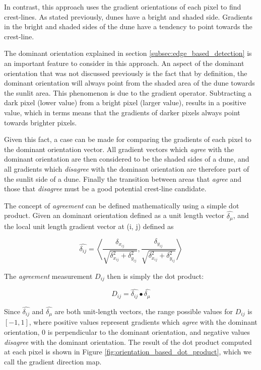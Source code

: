 In contrast, this approach uses the gradient orientations of each pixel to find crest-lines. As stated previously, dunes have a bright and shaded side. Gradients in the bright and shaded sides of the dune have a tendency to point towards the crest-line.

The dominant orientation explained in section \ref{subsec:edge_based_detection} is an important feature to consider in this approach. An aspect of the dominant orientation that was not discussed previously is the fact that by definition, the dominant orientation will always point from the shaded area of the dune towards the sunlit area. This phenomenon is due to the gradient operator. Subtracting a dark pixel (lower value) from a bright pixel (larger value), results in a positive value, which in terms means that the gradients of darker pixels always point towards brighter pixels.

Given this fact, a case can be made for comparing the gradients of each pixel to the dominant orientation vector. All gradient vectors which \emph{agree} with the dominant orientation are then considered to be the shaded sides of a dune, and all gradients which \emph{disagree} with the dominant orientation are therefore part of the sunlit side of a dune. Finally the transition between areas that \emph{agree} and those that \emph{disagree} must be a good potential crest-line candidate.

The concept of \emph{agreement} can be defined mathematically using a simple dot product. Given an dominant orientation defined as a unit length vector $\hat{\delta_{\mu}}$, and the local unit length gradient vector at (i, j) defined as

\begin{equation}
\hat{\delta_{ij}} = \left\langle \frac{\delta_{x_{ij}}}{\sqrt{\delta_{x_{ij}}^2 + \delta_{y_{ij}}^2}}, \frac{\delta_{y_{ij}}}{\sqrt{\delta_{x_{ij}}^2 + \delta_{y_{ij}}^2}}\right\rangle 
\end{equation}

The \emph{agreement} measurement $D_{ij}$ then is simply the dot product:

\begin{equation}
D_{ij} = \hat{\delta_{ij}} \bullet \hat{\delta_{\mu}}
\end{equation}

Since $\hat{\delta_{ij}}$ and $\hat{\delta_{\mu}}$ are both unit-length vectors, the range possible values for $D_{ij}$ is $[-1, 1]$, where positive values represent gradients which \emph{agree} with the dominant orientation, 0 is perpendicular to the dominant orientation, and negative values \emph{disagree} with the dominant orientation. The result of the dot product computed at each pixel is shown in Figure \ref{fig:orientation_based_dot_product}, which we call the gradient direction map.

